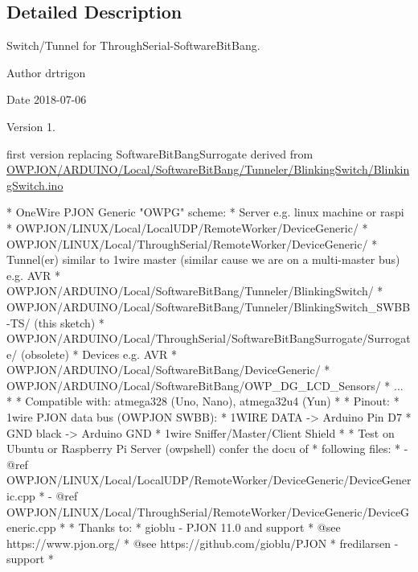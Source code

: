\subsection{Detailed Description}
Switch/\-Tunnel for Through\-Serial-\/\-Software\-Bit\-Bang. \begin{DoxyAuthor}{Author}
drtrigon 
\end{DoxyAuthor}
\begin{DoxyDate}{Date}
2018-\/07-\/06 
\end{DoxyDate}
\begin{DoxyVersion}{Version}
1. \begin{DoxyItemize}
\item first version replacing Software\-Bit\-Bang\-Surrogate derived from \hyperlink{BlinkingSwitch_8ino}{O\-W\-P\-J\-O\-N/\-A\-R\-D\-U\-I\-N\-O/\-Local/\-Software\-Bit\-Bang/\-Tunneler/\-Blinking\-Switch/\-Blinking\-Switch.\-ino}\end{DoxyItemize}
\begin{DoxyVerb}* OneWire PJON Generic "OWPG" scheme:
*   Server e.g. linux machine or raspi
*      OWPJON/LINUX/Local/LocalUDP/RemoteWorker/DeviceGeneric/
*      OWPJON/LINUX/Local/ThroughSerial/RemoteWorker/DeviceGeneric/
*   Tunnel(er) similar to 1wire master (similar cause we are on a multi-master bus) e.g. AVR
*      OWPJON/ARDUINO/Local/SoftwareBitBang/Tunneler/BlinkingSwitch/
*      OWPJON/ARDUINO/Local/SoftwareBitBang/Tunneler/BlinkingSwitch_SWBB-TS/ (this sketch)
*      OWPJON/ARDUINO/Local/ThroughSerial/SoftwareBitBangSurrogate/Surrogate/ (obsolete)
*   Devices e.g. AVR
*      OWPJON/ARDUINO/Local/SoftwareBitBang/DeviceGeneric/
*      OWPJON/ARDUINO/Local/SoftwareBitBang/OWP_DG_LCD_Sensors/
*      ...
*
* Compatible with: atmega328 (Uno, Nano), atmega32u4 (Yun)
*
* Pinout:
*   1wire PJON data bus (OWPJON SWBB):
*        1WIRE DATA    -> Arduino Pin D7
*        GND black     -> Arduino GND
*   1wire Sniffer/Master/Client Shield
*
* Test on Ubuntu or Raspberry Pi Server (owpshell) confer the docu of
* following files:
*   - @ref OWPJON/LINUX/Local/LocalUDP/RemoteWorker/DeviceGeneric/DeviceGeneric.cpp
*   - @ref OWPJON/LINUX/Local/ThroughSerial/RemoteWorker/DeviceGeneric/DeviceGeneric.cpp
*
* Thanks to:
* gioblu - PJON 11.0 and support
*          @see https://www.pjon.org/
*          @see https://github.com/gioblu/PJON
* fredilarsen - support
* \end{DoxyVerb}
 
\end{DoxyVersion}


